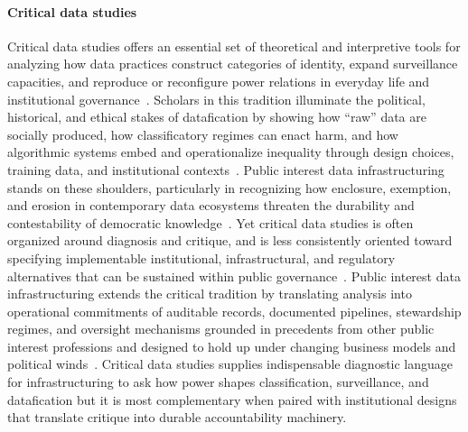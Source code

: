 \documentclass[acmsmall,screen]{acmart}
\begin{document}
\paragraph*{Critical data studies}
Critical data studies offers an essential set of theoretical and interpretive tools for analyzing how data practices construct categories of identity, expand surveillance capacities, and reproduce or reconfigure power relations in everyday life and institutional governance~\cite{boydCriticalQuestionsBig2012,vandijckDataficationDataismDataveillance2014,puschmannBigDataBig2014}. Scholars in this tradition illuminate the political, historical, and ethical stakes of datafication by showing how ``raw'' data are socially produced, how classificatory regimes can enact harm, and how algorithmic systems embed and operationalize inequality through design choices, training data, and institutional contexts~\cite{dentonGenealogyMachineLearning2021,greenDataSciencePolitical2021}. Public interest data infrastructuring stands on these shoulders, particularly in recognizing how enclosure, exemption, and erosion in contemporary data ecosystems threaten the durability and contestability of democratic knowledge~\cite{Freelon_ComputationalResearchPostAPI_2018,taylorPublicActorsPublic2021,Bruns_APIcalypsesocialmedia_2019}. Yet critical data studies is often organized around diagnosis and critique, and is less consistently oriented toward specifying implementable institutional, infrastructural, and regulatory alternatives that can be sustained within public governance~\cite{latourWhyHasCritique2004,neffCritiqueContributePracticeBased2017}. Public interest data infrastructuring extends the critical tradition by translating analysis into operational commitments of auditable records, documented pipelines, stewardship regimes, and oversight mechanisms grounded in precedents from other public interest professions and designed to hold up under changing business models and political winds~\cite{acker_DataCraftTheory_2019,schwartz_archives_2002,hutchinsonAccountabilityMachineLearning2021}. Critical data studies supplies indispensable diagnostic language for infrastructuring to ask how power shapes classification, surveillance, and datafication but it is most complementary when paired with institutional designs that translate critique into durable accountability machinery.
\end{document}
